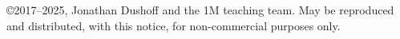 \copyright 2017--2025, Jonathan Dushoff and the 1M teaching team.  May be reproduced and distributed, with this notice, for non-commercial purposes only.
